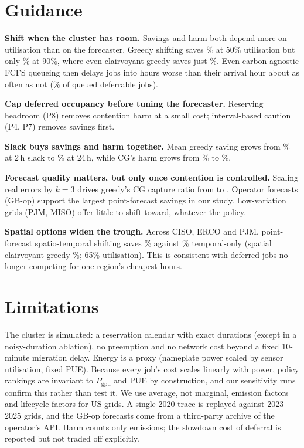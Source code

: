 \section{Guidance}\label{sec:guidance}

\textbf{Shift when the cluster has room.} Savings and harm both depend more on utilisation than on
the forecaster. Greedy shifting saves \% at 50\%
utilisation but only \% at 90\%, where even clairvoyant greedy
saves just \%. Even carbon-agnostic FCFS
queueing then delays jobs into hours worse than their arrival hour about as often as not
(\% of queued deferrable jobs).

\textbf{Cap deferred occupancy before tuning the forecaster.} Reserving headroom (P8) removes
contention harm at a small cost; interval-based caution (P4, P7) removes savings first.

\textbf{Slack buys savings and harm together.} Mean greedy saving grows from
\% at 2\,h slack to \% at 24\,h,
while CG's harm grows from \% to \%.

\textbf{Forecast quality matters, but only once contention is controlled.} Scaling real errors by
$k{=}3$ drives greedy's CG capture ratio from  to
. Operator forecasts (GB-op) support the largest point-forecast savings in our study.
Low-variation grids (PJM, MISO) offer little to shift toward, whatever the policy.

\textbf{Spatial options widen the trough.} Across CISO, ERCO and PJM, point-forecast
spatio-temporal shifting saves \% against
\% temporal-only (spatial clairvoyant greedy \%; 65\% utilisation). This is consistent
with deferred jobs no longer competing for one region's cheapest hours.

\section{Limitations}\label{sec:limits}
The cluster is simulated: a reservation calendar with exact durations (except in a noisy-duration
ablation), no preemption and no network cost beyond a fixed 10-minute migration delay. Energy is a
proxy (nameplate power scaled by sensor utilisation, fixed PUE). Because every job's cost scales
linearly with power, policy rankings are invariant to $P_{\mathrm{gpu}}$ and PUE by construction, and
our sensitivity runs confirm this rather than test it. We use average, not marginal, emission factors
and lifecycle factors for US grids. A single 2020 trace is replayed against 2023--2025 grids, and the
GB-op forecasts come from a third-party archive of the operator's API. Harm counts only emissions; the
slowdown cost of deferral is reported but not traded off explicitly.

